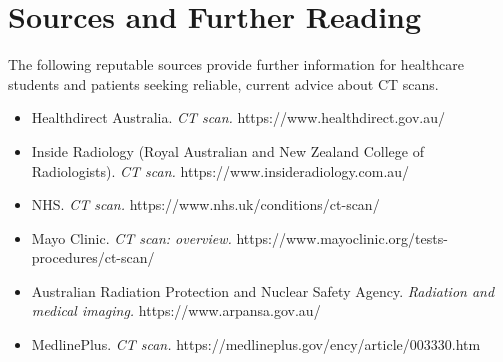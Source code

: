 \section*{Sources and Further Reading}
The following reputable sources provide further information for healthcare students and patients seeking reliable, current advice about CT scans.

\begin{itemize}
    \item Healthdirect Australia. \textit{CT scan.} https://www.healthdirect.gov.au/
    \item Inside Radiology (Royal Australian and New Zealand College of Radiologists). \textit{CT scan.} https://www.insideradiology.com.au/
    \item NHS. \textit{CT scan.} https://www.nhs.uk/conditions/ct-scan/
    \item Mayo Clinic. \textit{CT scan: overview.} https://www.mayoclinic.org/tests-procedures/ct-scan/
    \item Australian Radiation Protection and Nuclear Safety Agency. \textit{Radiation and medical imaging.} https://www.arpansa.gov.au/
    \item MedlinePlus. \textit{CT scan.} https://medlineplus.gov/ency/article/003330.htm
\end{itemize}
